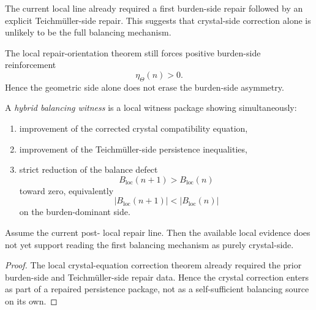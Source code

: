 \begin{remark}
\label{rem:why-pure-crystal-correction-probably-not-enough}
The current local line already required a first burden-side repair followed by an explicit Teichm\"uller-side repair. This suggests that crystal-side correction alone is unlikely to be the full balancing mechanism.
\end{remark}

\begin{remark}
\label{rem:why-pure-teichmueller-correction-probably-not-enough}
The local repair-orientation theorem still forces positive burden-side reinforcement
\[
 \eta_{\Theta}(n)>0.
\]
Hence the geometric side alone does not erase the burden-side asymmetry.
\end{remark}

\begin{definition}
\label{def:hybrid-balancing-witness}
A \emph{hybrid balancing witness} is a local witness package showing simultaneously:
\begin{enumerate}[leftmargin=2em,label=(\alph*)]
 \item improvement of the corrected crystal compatibility equation,
 \item improvement of the Teichm\"uller-side persistence inequalities,
 \item strict reduction of the balance defect
 \[
 B_{\mathrm{loc}}(n+1)>B_{\mathrm{loc}}(n)
 \]
 toward zero, equivalently
 \[
 |B_{\mathrm{loc}}(n+1)|<|B_{\mathrm{loc}}(n)|
 \]
 on the burden-dominant side.
\end{enumerate}
\end{definition}

\begin{proposition}
\label{prop:current-line-does-not-yet-support-purely-crystal-balancing}
Assume the current post- local repair line. Then the available local evidence does not yet support reading the first balancing mechanism as purely crystal-side.
\end{proposition}

\begin{proof}
The local crystal-equation correction theorem already required the prior burden-side and Teichm\"uller-side repair data. Hence the crystal correction enters as part of a repaired persistence package, not as a self-sufficient balancing source on its own.
\end{proof}

